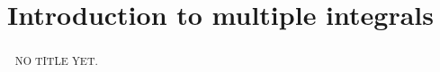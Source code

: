 \documentclass{ximera}
\title[Dig-In:]{Introduction to multiple integrals}
\begin{document}
\begin{abstract}
NO TITLE YET.
\end{abstract}
\maketitle






\end{document}
